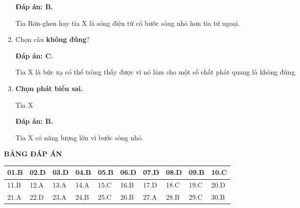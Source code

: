 \begin{enumerate}[label=\bfseries Câu \arabic*:]
	\loigiai
	{		\textbf{Đáp án: B.}
		
Tia Rơn-ghen hay tia X là sóng điện từ có bước sóng nhỏ hơn tia tử ngoại. 
		
	}
	
	\item {} 
	
	\cauhoi
	{Chọn câu \textbf{không đúng}?
	}
	
	\loigiai
	{		\textbf{Đáp án: C.}
		
Tia X là bức xạ có thể trông thấy được vì nó làm cho một số chất phát quang là không đúng.
		
	}
	
	\item {} 
	
	\cauhoi
	{\textbf{Chọn phát biểu sai.}
	
	Tia X
	}
	
	\loigiai
	{		\textbf{Đáp án: B.}

Tia X có năng lượng lớn vì bước sóng nhỏ.
		
	}
	
\end{enumerate}

\loigiai
{
	\begin{center}
		\textbf{BẢNG ĐÁP ÁN}
	\end{center}
	\begin{center}
		\begin{tabular}{|m{2.8em}|m{2.8em}|m{2.8em}|m{2.8em}|m{2.8em}|m{2.8em}|m{2.8em}|m{2.8em}|m{2.8em}|m{2.8em}|}
			\hline
			01.B  & 02.D  & 03.D  & 04.B  & 05.B  & 06.D  & 07.D & 08.D & 09.B & 10.C \\
			\hline
			11.B  & 12.A  & 13.A  & 14.A  & 15.C  & 16.B  & 17.D & 18.C & 19.C & 20.D \\
			\hline
			21.A  & 22.D  & 23.A  & 24.B  & 25.C  & 26.B  & 27.A & 28.B & 29.C & 30.B \\
			\hline
			
		\end{tabular}
	\end{center}
}

